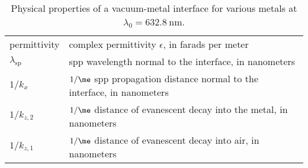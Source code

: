 \begin{table}
\begin{tabularx}{\textwidth}{ll}
permittivity & complex permittivity $\epsilon$, in farads per meter \\
$\lambda_\text{sp}$ & \gls{spp} wavelength normal to the interface, in nanometers\\
$1/k_x$ & $1/\me$ \gls{spp} propagation distance normal to the interface, in nanometers \\
$1/k_{z,2}$ & $1/\me$ distance of evanescent decay into the metal, in nanometers \\
$1/k_{z,1}$ & $1/\me$ distance of evanescent decay into air, in nanometers \\
\bottomrule
\end{tabularx}
\caption{Physical properties of a vacuum-metal interface for various metals at
$\lambda_0=\SI{632.8}{\nano\meter}$. }%
\label{tbl:sptable_632}
\end{table}
